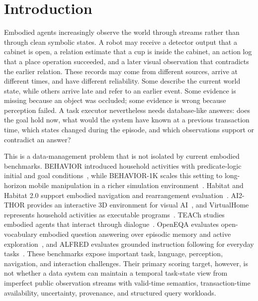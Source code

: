 
\section{Introduction}

Embodied agents increasingly observe the world through streams rather than through clean symbolic states. A robot may receive a detector output that a cabinet is open, a relation estimate that a cup is inside the cabinet, an action log that a place operation succeeded, and a later visual observation that contradicts the earlier relation. These records may come from different sources, arrive at different times, and have different reliability. Some describe the current world state, while others arrive late and refer to an earlier event. Some evidence is missing because an object was occluded; some evidence is wrong because perception failed. A task executor nevertheless needs database-like answers: does the goal hold now, what would the system have known at a previous transaction time, which states changed during the episode, and which observations support or contradict an answer?

This is a data-management problem that is not isolated by current embodied benchmarks. BEHAVIOR introduced household activities with predicate-logic initial and goal conditions~\cite{srivastava2022behavior}, while BEHAVIOR-1K scales this setting to long-horizon mobile manipulation in a richer simulation environment~\cite{li2024behavior1k}. Habitat and Habitat 2.0 support embodied navigation and rearrangement evaluation~\cite{savva2019habitat,szot2021habitat}. AI2-THOR provides an interactive 3D environment for visual AI~\cite{kolve2017ai2thor}, and VirtualHome represents household activities as executable programs~\cite{puig2018virtualhome}. TEACh studies embodied agents that interact through dialogue~\cite{padmakumar2022teach}. OpenEQA evaluates open-vocabulary embodied question answering over episodic memory and active exploration~\cite{majumdar2024openeqa}, and ALFRED evaluates grounded instruction following for everyday tasks~\cite{shridhar2020alfred}. These benchmarks expose important task, language, perception, navigation, and interaction challenges. Their primary scoring target, however, is not whether a data system can maintain a temporal task-state view from imperfect public observation streams with valid-time semantics, transaction-time availability, uncertainty, provenance, and structured query workloads.

